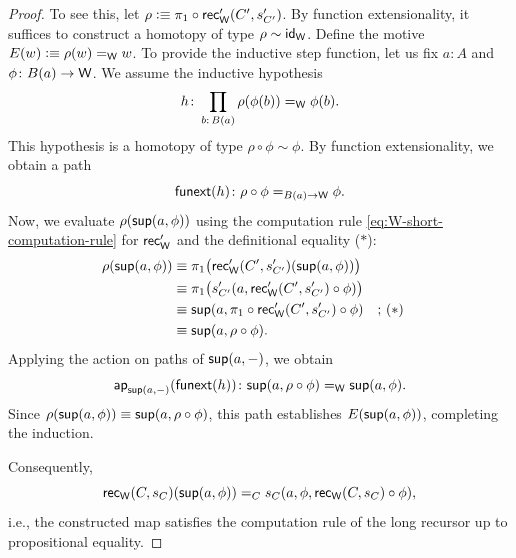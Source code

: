 \begin{proof}
    To see this, let $\rho\mathrel{\vcentcolon}\equiv\pi_1\circ\mathsf{rec}'_{\mathsf{W}}(C',s'_{C'})$. By function extensionality, it suffices to construct a homotopy of type $\rho\sim\mathsf{id}_{\mathsf{W}}$.
    Define the motive $E(w)\mathrel{\vcentcolon}\equiv\rho(w)\mathrel{=_{\mathsf{W}}}w$. To provide the inductive step function, let us fix $a\colon A$ and $\phi\colon B(a)\to\fun W$. We assume the inductive hypothesis
    \[
        h\colon\prod_{b\colon B(a)}
            \rho(\phi(b))\eq{\fun W}\phi(b).
    \]
    This hypothesis is a homotopy of type $\rho\circ\phi\sim\phi$. By function extensionality, we obtain a path
    \[
        \fun{funext}(h)\colon
            \rho\circ\phi\eq{B(a)\to\fun W}\phi.
    \]
    Now, we evaluate $\rho(\mathsf{sup}(a,\phi))$ using the computation rule \eqref{eq:W-short-computation-rule} for $\mathsf{rec}'_{\mathsf{W}}$ and the definitional equality ($\ast$):
    \begin{align*}
        \rho(\mathsf{sup}(a,\phi))
            &\equiv\pi_1
                \bigl(
                    \mathsf{rec}'_{\mathsf{W}}(C',s'_{C'})
                        (\mathsf{sup}(a,\phi))
                \bigr)\\
            &\equiv\pi_1
                \bigl(
                    s'_{C'}
                        (
                            a,
                            \mathsf{rec}'_{\mathsf{W}}
                                (C',s'_{C'})\circ\phi
                        )
                \bigr)\\
            &\equiv\mathsf{sup}
                (
                    a,
                    \pi_1\circ\mathsf{rec}'_{\mathsf{W}}
                        (C',s'_{C'})\circ\phi
                )
                &&\text{; ($\ast$)}\\
            &\equiv\mathsf{sup}(a,\rho\circ\phi).
    \end{align*}
    Applying the action on paths of $\mathsf{sup}(a,{\mathord-})$, we obtain
    \[
        \fun{ap}_{\fun{sup}(a,\dummy)}(\fun{funext}(h))\colon
            \fun{sup}
                (
                    a,
                    \rho\circ\phi
                )\eq{\fun W}\fun{sup}(a,\phi).
    \]
    Since $\rho(\mathsf{sup}(a,\phi))\equiv\mathsf{sup}(a,\rho\circ\phi)$, this path establishes $E(\mathsf{sup}(a,\phi))$, completing the induction.
        
    Consequently,
    \[
        \mathsf{rec}_{\mathsf{W}}(C,s_C)(\mathsf{sup}(a,\phi))
            \mathrel{=_{C}}
                s_C
                    (
                        a,
                        \phi,\mathsf{rec}_{\mathsf{W}}(C,s_C)\circ\phi
                    ),
    \]
    i.e., the constructed map satisfies the computation rule of the long recursor up to propositional equality.
\end{proof}

